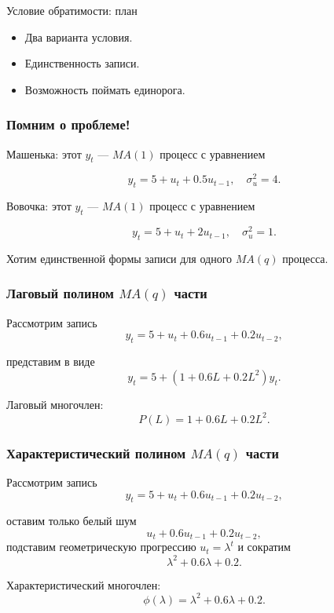 
\begin{frame} %


\end{frame}



\begin{frame}{Условие обратимости: план}
  \begin{itemize}[<+->]
    \item Два варианта условия. 
    \item Единственность записи.
    \item Возможность \alert{поймать единорога}.
  \end{itemize}

\end{frame}


\begin{frame}
  \frametitle{Помним о проблеме!}

  Машенька: этот $y_t$ — $MA(1)$ процесс с уравнением

  \[
    y_t = 5 + u_t + 0.5 u_{t-1}, \quad \sigma^2_u = 4.
  \]

  Вовочка: этот $y_t$ — $MA(1)$ процесс с уравнением

  \[
    y_t = 5 + u_t + 2 u_{t-1}, \quad \sigma^2_u = 1.
  \]

  \pause
  Хотим \alert{единственной формы} записи для одного $MA(q)$ процесса. 

\end{frame}


\begin{frame}
    \frametitle{Лаговый полином $MA(q)$ части}

    Рассмотрим запись 
    \[
        y_t = 5 + u_t + 0.6u_{t-1} + 0.2u_{t-2},
    \]

    \pause
    представим в виде
    \[
      y_t = 5 + (1 + 0.6 L + 0.2 L^2) y_t.
    \]

    \pause
    \alert{Лаговый многочлен}:
    \[
    P(L) = 1 + 0.6 L + 0.2 L^2.
    \]

\end{frame}

\begin{frame}
    \frametitle{Характеристический полином $MA(q)$ части}

    Рассмотрим запись 
    \[
        y_t = 5 + u_t + 0.6u_{t-1} + 0.2u_{t-2},
    \]

    \pause
    оставим только белый шум
    \[
        u_t + 0.6u_{t-1} + 0.2u_{t-2},
    \]
    \pause 
    подставим геометрическую прогрессию $u_t = \lambda^t$ и сократим
    \[
     \lambda^2 + 0.6 \lambda + 0.2.
    \]

    \pause
    \alert{Характеристический многочлен}:
    \[
    \phi(\lambda) = \lambda^2 + 0.6 \lambda + 0.2.
    \]

\end{frame}

